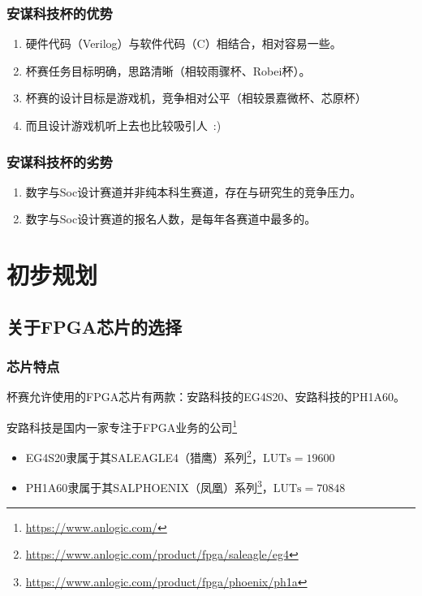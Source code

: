 \documentclass[compress,aspectratio=169]{ctexbeamer}
\begin{document}
\begin{frame}
    \frametitle{安谋科技杯的优势}
    \begin{enumerate}
        \item 硬件代码（Verilog）与软件代码（C）相结合，相对容易一些。
        \item 杯赛任务目标明确，思路清晰（相较雨骤杯、Robei杯）。
        \item 杯赛的设计目标是游戏机，竞争相对公平（相较景嘉微杯、芯原杯）
        \item 而且设计游戏机听上去也比较吸引人~:)
    \end{enumerate}
\end{frame}

\begin{frame}
    \frametitle{安谋科技杯的劣势}
    \begin{enumerate}
        \item 数字与Soc设计赛道并非纯本科生赛道，存在与研究生的竞争压力。
        \item 数字与Soc设计赛道的报名人数，是每年各赛道中最多的。
    \end{enumerate}
\end{frame}

\section{初步规划}

\subsection{关于FPGA芯片的选择}

\begin{frame}[fragile]
    \frametitle{芯片特点}
    杯赛允许使用的FPGA芯片有两款：安路科技的EG4S20、安路科技的PH1A60。

    安路科技是国内一家专注于FPGA业务的公司\footnote{\url{https://www.anlogic.com/}}
    \begin{itemize}
        \item EG4S20隶属于其SALEAGLE4（猎鹰）系列\footnote{\url{https://www.anlogic.com/product/fpga/saleagle/eg4}}，$\text{LUTs}=19600$
        \item PH1A60隶属于其SALPHOENIX（凤凰）系列\footnote{\url{https://www.anlogic.com/product/fpga/phoenix/ph1a}}，$\text{LUTs}=70848$
    \end{itemize}
\end{frame}
\end{document}
